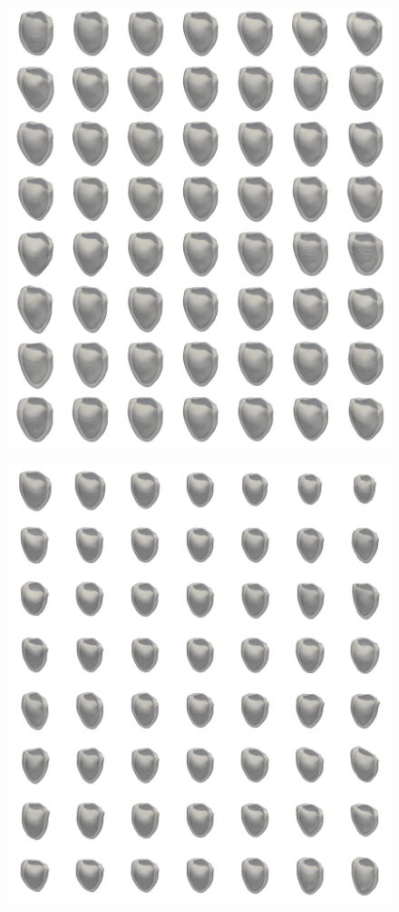 \documentclass[fleqn,10pt]{wlscirep}
\begin{document}
\begin{figure}
\includegraphics[width=\textwidth]{figs/supplementary/experiment_1_synthetic_meshes}
\caption{}
\label{fig:experiment_1_synthetic_meshes}
\end{figure}

\begin{figure}
\includegraphics[width=\textwidth]{figs/supplementary/experiment_2_synthetic_meshes}
\caption{}
\label{fig:experiment_2_synthetic_meshes}
\end{figure}
\end{document}
